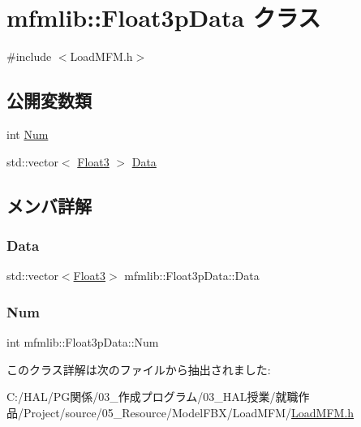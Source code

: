 \hypertarget{classmfmlib_1_1_float3p_data}{}\section{mfmlib\+:\+:Float3p\+Data クラス}
\label{classmfmlib_1_1_float3p_data}


{\ttfamily \#include $<$Load\+M\+F\+M.\+h$>$}

\subsection*{公開変数類}
\begin{DoxyCompactItemize}
\item 
int \mbox{\hyperlink{classmfmlib_1_1_float3p_data_ae0785dd7af23fffbaa3c4d0b772e9e1f}{Num}}
\item 
std\+::vector$<$ \mbox{\hyperlink{structmfmlib_1_1_float3}{Float3}} $>$ \mbox{\hyperlink{classmfmlib_1_1_float3p_data_abb697c919314c799a539ea3934212ef2}{Data}}
\end{DoxyCompactItemize}


\subsection{メンバ詳解}
\mbox{\label{classmfmlib_1_1_float3p_data_abb697c919314c799a539ea3934212ef2}} 
\subsubsection{\texorpdfstring{Data}{Data}}
{\footnotesize\ttfamily std\+::vector$<$\mbox{\hyperlink{structmfmlib_1_1_float3}{Float3}}$>$ mfmlib\+::\+Float3p\+Data\+::\+Data}

\mbox{\label{classmfmlib_1_1_float3p_data_ae0785dd7af23fffbaa3c4d0b772e9e1f}} 
\subsubsection{\texorpdfstring{Num}{Num}}
{\footnotesize\ttfamily int mfmlib\+::\+Float3p\+Data\+::\+Num}



このクラス詳解は次のファイルから抽出されました\+:\begin{DoxyCompactItemize}
\item 
C\+:/\+H\+A\+L/\+P\+G関係/03\+\_\+作成プログラム/03\+\_\+\+H\+A\+L授業/就職作品/\+Project/source/05\+\_\+\+Resource/\+Model\+F\+B\+X/\+Load\+M\+F\+M/\mbox{\hyperlink{_load_m_f_m_8h}{Load\+M\+F\+M.\+h}}\end{DoxyCompactItemize}
